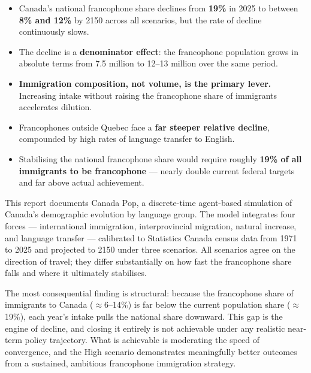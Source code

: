\documentclass[11pt,a4paper]{article}
\begin{document}
\begin{tcolorbox}[keybox, title=At a Glance]
\begin{itemize}
  \item Canada's national francophone share declines from \textbf{19\%} in 2025
        to between \textbf{8\% and 12\%} by 2150 across all scenarios, but the
        rate of decline continuously slows.
  \item The decline is a \textbf{denominator effect}: the francophone population
        grows in absolute terms from 7.5 million to 12--13 million over the
        same period.
  \item \textbf{Immigration composition, not volume, is the primary lever.}
        Increasing intake without raising the francophone share of immigrants
        accelerates dilution.
  \item Francophones outside Quebec face a \textbf{far steeper relative
        decline}, compounded by high rates of language transfer to English.
  \item Stabilising the national francophone share would require roughly
        \textbf{19\% of all immigrants to be francophone} --- nearly double
        current federal targets and far above actual achievement.
\end{itemize}
\end{tcolorbox}

\bigskip

This report documents Canada Pop, a discrete-time agent-based simulation of
Canada's demographic evolution by language group.  The model integrates four
forces --- international immigration, interprovincial migration, natural
increase, and language transfer --- calibrated to Statistics Canada census
data from 1971 to 2025 and projected to 2150 under three scenarios.  All
scenarios agree on the direction of travel; they differ substantially on how
fast the francophone share falls and where it ultimately stabilises.

The most consequential finding is structural: because the francophone share of
immigrants to Canada ($\approx$6--14\%) is far below the current population
share ($\approx$19\%), each year's intake pulls the national share downward.
This gap is the engine of decline, and closing it entirely is not achievable
under any realistic near-term policy trajectory.  What is achievable is
moderating the speed of convergence, and the High scenario demonstrates
meaningfully better outcomes from a sustained, ambitious francophone
immigration strategy.
\end{document}
